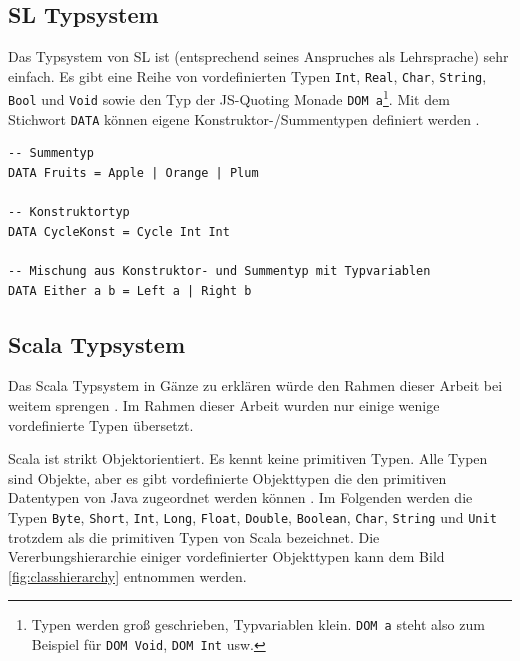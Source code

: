 \documentclass[12pt]{scrreprt}
\begin{document}
\subsection{SL Typsystem}

Das Typsystem von \ac{SL} ist (entsprechend seines Anspruches als Lehrsprache) sehr einfach. Es gibt eine Reihe von vordefinierten Typen \lstinline!Int!, \lstinline!Real!, \lstinline!Char!, \lstinline!String!, \lstinline!Bool! und \lstinline!Void! sowie den Typ der \ac{JS}-Quoting Monade \lstinline!DOM a!\footnote{Typen werden groß geschrieben, Typvariablen klein. \lstinline!DOM a! steht also zum Beispiel für \lstinline!DOM Void!, \lstinline!DOM Int! usw.}. Mit dem Stichwort \lstinline!DATA! können eigene Konstruktor-/Summentypen definiert werden \cite[S. 123]{Pepper2007}.

\begin{lstlisting}[caption=Beispiele für selbst definierte Datentypen in \ac{SL}, label=lst:bsp2]
-- Summentyp
DATA Fruits = Apple | Orange | Plum

-- Konstruktortyp
DATA CycleKonst = Cycle Int Int

-- Mischung aus Konstruktor- und Summentyp mit Typvariablen
DATA Either a b = Left a | Right b
\end{lstlisting}

\subsection{Scala Typsystem}

Das Scala Typsystem in Gänze zu erklären würde den Rahmen dieser Arbeit bei weitem sprengen \cite{Odersky2013}. Im Rahmen dieser Arbeit wurden nur einige wenige vordefinierte Typen übersetzt.

Scala ist strikt Objektorientiert. Es kennt keine primitiven Typen. Alle Typen sind Objekte, aber es gibt vordefinierte Objekttypen die den primitiven Datentypen von Java zugeordnet werden können \cite{Paggen2013}. Im Folgenden werden die Typen \lstinline!Byte!, \lstinline!Short!, \lstinline!Int!, \lstinline!Long!, \lstinline!Float!, \lstinline!Double!, \lstinline!Boolean!, \lstinline!Char!, \lstinline!String! und \lstinline!Unit! trotzdem als die primitiven Typen von Scala bezeichnet. Die Vererbungshierarchie einiger vordefinierter Objekttypen kann dem Bild \ref{fig:classhierarchy} entnommen werden.
\end{document}
